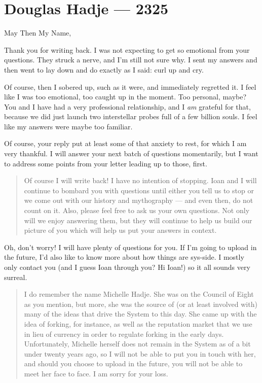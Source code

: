 \hypertarget{douglas-hadje-2325}{%
\chapter{Douglas Hadje — 2325}\label{douglas-hadje-2325}}

May Then My Name,

Thank you for writing back. I was not expecting to get so emotional from your questions. They struck a nerve, and I'm still not sure why. I sent my answers and then went to lay down and do exactly as I said: curl up and cry.

Of course, then I sobered up, such as it were, and immediately regretted it. I feel like I was too emotional, too caught up in the moment. Too personal, maybe? You and I have had a very professional relationship, and I \emph{am} grateful for that, because we did just launch two interstellar probes full of a few billion souls. I feel like my answers were maybe too familiar.

Of course, your reply put at least some of that anxiety to rest, for which I am very thankful. I will answer your next batch of questions momentarily, but I want to address some points from your letter leading up to those, first.

\begin{quote}
Of course I will write back! I have no intention of stopping. Ioan and I will continue to bombard you with questions until either you tell us to stop or we come out with our history and mythography — and even then, do not count on it. Also, please feel free to ask us your own questions. Not only will we enjoy answering them, but they will continue to help us build our picture of you which will help us put your answers in context.
\end{quote}

Oh, don't worry! I will have plenty of questions for you. If I'm going to upload in the future, I'd also like to know more about how things are sys-side. I mostly only contact you (and I guess Ioan through you? Hi Ioan!) so it all sounds very surreal.

\begin{quote}
I do remember the name Michelle Hadje. She was on the Council of Eight as you mention, but more, she was the source of (or at least involved with) many of the ideas that drive the System to this day. She came up with the idea of forking, for instance, as well as the reputation market that we use in lieu of currency in order to regulate forking in the early days. Unfortunately, Michelle herself does not remain in the System as of a bit under twenty years ago, so I will not be able to put you in touch with her, and should you choose to upload in the future, you will not be able to meet her face to face. I am sorry for your loss.
\end{quote}

